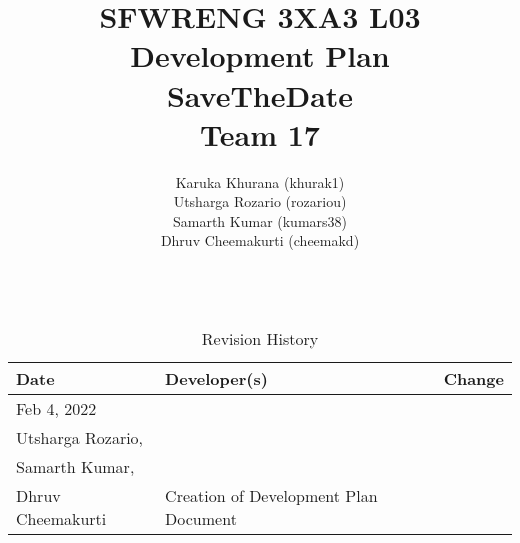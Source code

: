 \documentclass[12pt, titlepage]{article}
\title{SFWRENG 3XA3 L03 \\ Development Plan
        \\[1ex] \large SaveTheDate\\ Team 17}
\author{
        Karuka Khurana (khurak1)\\
        Utsharga Rozario (rozariou)\\
        Samarth Kumar (kumars38)\\
        Dhruv Cheemakurti (cheemakd)\\
        \\
}
\begin{document}
\maketitle

\tableofcontents
\listoftables
\listoffigures

\begin{table}[!hbp]
    \caption{Revision History} \label{RevisionHistory}
    \begin{tabularx}{\textwidth}{llX}
        \toprule
            \textbf{Date} & \textbf{Developer(s)} & \textbf{Change}\\
        \midrule
		Feb 4, 2022 & \begin{tabular}{@{}c@{}}Karuka Khurana,\\Utsharga Rozario,\\Samarth Kumar,\\Dhruv Cheemakurti\end{tabular} & Creation of Development Plan Document\\ 
        \bottomrule
    \end{tabularx}
\end{table}

\newpage

\maketitle

\newpage
\end{document}

